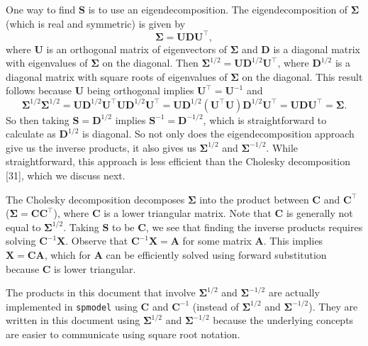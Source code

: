 \documentclass[10pt,letterpaper]{article}
\begin{document}
One way to find \(\mathbf{S}\) is to use an eigendecomposition. The
eigendecomposition of \(\boldsymbol{\Sigma}\) (which is real and
symmetric) is given by \begin{equation*}
\boldsymbol{\Sigma} = \mathbf{U} \mathbf{D} \mathbf{U}^\top,
\end{equation*} where \(\mathbf{U}\) is an orthogonal matrix of
eigenvectors of \(\boldsymbol{\Sigma}\) and \(\mathbf{D}\) is a diagonal
matrix with eigenvalues of \(\boldsymbol{\Sigma}\) on the diagonal. Then
\(\boldsymbol{\Sigma}^{1/2} = \mathbf{U} \mathbf{D}^{1/2} \mathbf{U}^\top\),
where \(\mathbf{D}^{1/2}\) is a diagonal matrix with square roots of
eigenvalues of \(\boldsymbol{\Sigma}\) on the diagonal. This result
follows because \(\mathbf{U}\) being orthogonal implies
\(\mathbf{U}^\top = \mathbf{U}^{-1}\) and \begin{equation*}
\boldsymbol{\Sigma}^{1/2}\boldsymbol{\Sigma}^{1/2} = \mathbf{U} \mathbf{D}^{1/2} \mathbf{U}^\top \mathbf{U} \mathbf{D}^{1/2} \mathbf{U}^\top = \mathbf{U} \mathbf{D}^{1/2} (\mathbf{U}^\top \mathbf{U}) \mathbf{D}^{1/2} \mathbf{U}^\top = \mathbf{U} \mathbf{D} \mathbf{U}^\top = \boldsymbol{\Sigma}.
\end{equation*} So then taking \(\mathbf{S} = \mathbf{D}^{1/2}\) implies
\(\mathbf{S}^{-1} = \mathbf{D}^{-1/2}\), which is straightforward to
calculate as \(\mathbf{D}^{1/2}\) is diagonal. So not only does the
eigendecomposition approach give us the inverse products, it also gives
us \(\boldsymbol{\Sigma}^{1/2}\) and \(\boldsymbol{\Sigma}^{-1/2}\).
While straightforward, this approach is less efficient than the Cholesky
decomposition {[}31{]}, which we discuss next.

The Cholesky decomposition decomposes \(\boldsymbol{\Sigma}\) into the
product between \(\mathbf{C}\) and \(\mathbf{C}^\top\)
(\(\boldsymbol{\Sigma} = \mathbf{C}\mathbf{C}^\top\)), where
\(\mathbf{C}\) is a lower triangular matrix. Note that \(\mathbf{C}\) is
generally not equal to \(\boldsymbol{\Sigma}^{1/2}\). Taking
\(\mathbf{S}\) to be \(\mathbf{C}\), we see that finding the inverse
products requires solving \(\mathbf{C}^{-1}\mathbf{X}\). Observe that
\(\mathbf{C}^{-1}\mathbf{X} = \mathbf{A}\) for some matrix
\(\mathbf{A}\). This implies \(\mathbf{X} = \mathbf{C}\mathbf{A}\),
which for \(\mathbf{A}\) can be efficiently solved using forward
substitution because \(\mathbf{C}\) is lower triangular.

The products in this document that involve \(\boldsymbol{\Sigma}^{1/2}\)
and \(\boldsymbol{\Sigma}^{-1/2}\) are actually implemented in
\texttt{spmodel} using \(\mathbf{C}\) and \(\mathbf{C}^{-1}\) (instead
of \(\boldsymbol{\Sigma}^{1/2}\) and \(\boldsymbol{\Sigma}^{-1/2}\)).
They are written in this document using \(\boldsymbol{\Sigma}^{1/2}\)
and \(\boldsymbol{\Sigma}^{-1/2}\) because the underlying concepts are
easier to communicate using square root notation.
\end{document}
